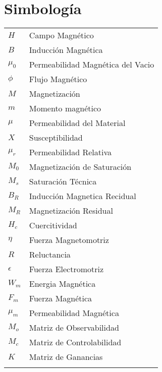 \chapter{Simbolog\'ia}


\begin{tabular}{ll}
	$H$\hspace{3cm} & Campo Magn\'etico \\
	$B$\hspace{3cm} & Inducci\'on Magn\'etica\\
	$\mu_0$\hspace{3cm} & Permeabilidad Magn\'etica del Vacio \\
	$\phi$\hspace{3cm} & Flujo Magn\'etico\\
	$M$\hspace{3cm} & Magnetizaci\'on\\
	$m$\hspace{3cm} & Momento magn\'etico\\
	$\mu$\hspace{3cm} & Permeabilidad del Material\\ 
	$X$\hspace{3cm} & Susceptibilidad\\
	$\mu_r$\hspace{3cm} & Permeabilidad Relativa\\
	$M_0$\hspace{3cm} & Magnetizaci\'on de Saturaci\'on\\
	$M_s$\hspace{3cm} & Saturaci\'on T\'ecnica\\
	$B_R$\hspace{3cm} & Inducci\'on Magnetica Recidual\\
	$M_R$\hspace{3cm} & Magnetizaci\'on Residual\\
	$H_c$\hspace{3cm} & Cuercitividad\\
	$\eta$\hspace{3cm} & Fuerza Magnetomotriz\\
	$R$\hspace{3cm} & Reluctancia\\
	$\epsilon$\hspace{3cm} & Fuerza Electromotriz\\
	$W_m$\hspace{3cm} & Energia Magn\'etica\\
	$F_m$\hspace{3cm} & Fuerza Magn\'etica \\
	$\mu_m$\hspace{3cm} & Permeabilidad Magn\'etica\\	
	$M_o$\hspace{3cm} & Matriz de Observabilidad\\
	$M_c$\hspace{3cm} & Matriz de Controlabilidad\\
	$K$\hspace{3cm} & Matriz de Ganancias\\
	
	\\
\end{tabular}

